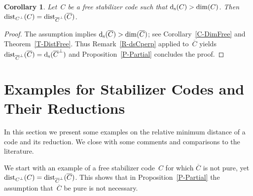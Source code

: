 \documentclass[11pt]{article}
\newtheorem{cor}[theo]{Corollary}
\theoremstyle{definition}
\numberwithin{equation}{section}
\newcommand{\ds}{\mbox{${\rm d}_{\rm s}$}}
\newcommand{\ov}[1]{\mbox{$\overline{#1}$}}
\newcommand{\dist}{\textup{dist}}
\begin{document}
\begin{cor}\label{C-GoodFree}
Let~$C$ be a free stabilizer code such that $\ds(C)>\dim(C)$.
Then $\dist_{C^\perp}(C)=\dist_{\small{\overline{C}^\perp}}(\ov{C})$.
\end{cor}

\begin{proof}
The assumption implies $\ds(\ov{C})>\dim(\ov{C})$; see Corollary~\ref{C-DimFree} and Theorem~\ref{T-DistFree}.
Thus Remark~\ref{R-dsCperp} applied to~$\ov{C}$ yields $\dist_{\small{\overline{C}^\perp}}(\ov{C})=\ds(\ov{C}^{\perp})$ and Proposition~\ref{P-Partial}
concludes the proof.
\end{proof}

\section{Examples for Stabilizer Codes and Their Reductions}\label{SS-Exa}
In this section we present some examples on the relative minimum distance of a code and its reduction.
We close with some comments and comparisons to the literature.

We start with an example of a free stabilizer code~$C$ for which $\ov{C}$ is not pure, yet $\dist_{C^\perp}(C)=\dist_{\small{\overline{C}^\perp}}(\ov{C})$.
This shows that in Proposition~\ref{P-Partial} the assumption that~$\ov{C}$ be pure is not necessary.
\end{document}
